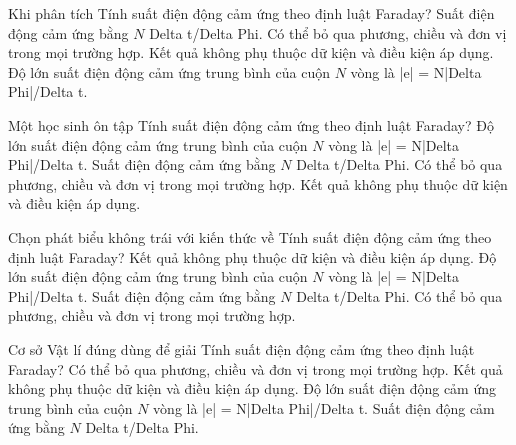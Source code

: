 \begin{ex}
Khi phân tích Tính suất điện động cảm ứng theo định luật Faraday?
\choice
{Suất điện động cảm ứng bằng $N$ Delta t/Delta Phi.}
{Có thể bỏ qua phương, chiều và đơn vị trong mọi trường hợp.}
{Kết quả không phụ thuộc dữ kiện và điều kiện áp dụng.}
{\True Độ lớn suất điện động cảm ứng trung bình của cuộn $N$ vòng là |e| = N|Delta Phi|/Delta t.}
\end{ex}

\begin{ex}
Một học sinh ôn tập Tính suất điện động cảm ứng theo định luật Faraday?
\choice
{\True Độ lớn suất điện động cảm ứng trung bình của cuộn $N$ vòng là |e| = N|Delta Phi|/Delta t.}
{Suất điện động cảm ứng bằng $N$ Delta t/Delta Phi.}
{Có thể bỏ qua phương, chiều và đơn vị trong mọi trường hợp.}
{Kết quả không phụ thuộc dữ kiện và điều kiện áp dụng.}
\end{ex}

\begin{ex}
Chọn phát biểu không trái với kiến thức về Tính suất điện động cảm ứng theo định luật Faraday?
\choice
{Kết quả không phụ thuộc dữ kiện và điều kiện áp dụng.}
{\True Độ lớn suất điện động cảm ứng trung bình của cuộn $N$ vòng là |e| = N|Delta Phi|/Delta t.}
{Suất điện động cảm ứng bằng $N$ Delta t/Delta Phi.}
{Có thể bỏ qua phương, chiều và đơn vị trong mọi trường hợp.}
\end{ex}

\begin{ex}
Cơ sở Vật lí đúng dùng để giải Tính suất điện động cảm ứng theo định luật Faraday?
\choice
{Có thể bỏ qua phương, chiều và đơn vị trong mọi trường hợp.}
{Kết quả không phụ thuộc dữ kiện và điều kiện áp dụng.}
{\True Độ lớn suất điện động cảm ứng trung bình của cuộn $N$ vòng là |e| = N|Delta Phi|/Delta t.}
{Suất điện động cảm ứng bằng $N$ Delta t/Delta Phi.}
\end{ex}

